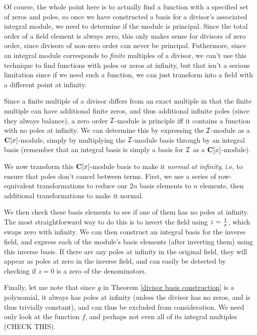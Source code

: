 \endtheorem

\vfill\eject

Of course, the whole point here is to actually find a function with a
specified set of zeros and poles, so once we have constructed a basis
for a divisor's associated integral module, we need to determine if
the module is principal.  Since the total order of a field element is
always zero, this only makes sense for divisors of zero order, since
divisors of non-zero order can never be principal.  Futhermore, since
an integral module corresponds to {\it finite} multiples of a divisor,
we can't use this technique to find functions with poles or zeros at
infinity, but that isn't a serious limitation since if we need such a
function, we can just transform into a field with a different point at
infinity.

Since a finite multiple of a divisor differs from an exact multiple in
that the finite multiple can have additional finite zeros, and thus
additional infinite poles (since they always balance), a zero order
${\cal I}$-module is principle iff it contains a function with no
poles at infinity.  We can determine this by expressing the ${\cal
I}$-module as a ${\bf C}[x]$-module, simply by multiplying the ${\cal
I}$-module basis through by an integral basis (remember that an
integral basis is simply a basis for ${\cal I}$ as a ${\bf
C}[x]$-module).

We now transform this ${\bf C}[x]$-module basis to make it {\it normal
at infinity}, i.e, to ensure that poles don't cancel between terms.
First, we use a series of row-equivalent transformations to reduce our
$2n$ basis elements to $n$ elements, then additional transformations
to make it normal.

We then check these basis elements to see if one of them has no poles
at infinity.  The most straightforward way to do this is to invert the
field using $z={1\over x}$, which swaps zero with infinity.  We can
then construct an integral basis for the inverse field, and express
each of the module's basis elements (after inverting them) using this
inverse basis.  If there are any poles at infinity in the original
field, they will appear as poles at zero in the inverse field, and can
easily be detected by checking if $z=0$ is a zero of the denominators.

Finally, let me note that since $g$ in Theorem \ref{divisor basis
construction} is a polynomial, it always has poles at infinity (unless
the divisor has no zeros, and is thus trivially constant), and can
thus be excluded from consideration.  We need only look at the
function $f$, and perhaps not even all of its integral multiples
(CHECK THIS).

